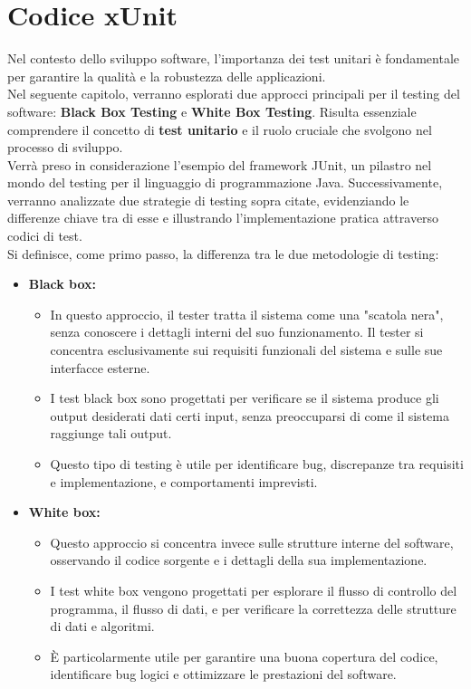 \documentclass{article}
\begin{document}
	\section{Codice xUnit}
	Nel contesto dello sviluppo software, l'importanza dei test unitari è fondamentale per garantire la qualità e la robustezza delle applicazioni.\\
	Nel seguente capitolo, verranno esplorati due approcci principali per il testing del software: \textbf{Black Box Testing} e \textbf{White Box Testing}. 
	Risulta essenziale comprendere il concetto di \textbf{test unitario} e il ruolo cruciale che svolgono nel processo di sviluppo.\\
	Verrà preso in considerazione l'esempio del framework JUnit, un pilastro nel mondo del testing per il linguaggio di programmazione Java. Successivamente, verranno analizzate due strategie di testing sopra citate, evidenziando le differenze chiave tra di esse e illustrando l'implementazione pratica attraverso codici di test.\\
	
	Si definisce, come primo passo, la differenza tra le due metodologie di testing:
	\begin{itemize}
		\item \textbf{Black box:}
		\begin{itemize}
			\item In questo approccio, il tester tratta il sistema come una "scatola nera", senza conoscere i dettagli interni del suo funzionamento. Il tester si concentra esclusivamente sui requisiti funzionali del sistema e sulle sue interfacce esterne.
			\item I test black box sono progettati per verificare se il sistema produce gli output desiderati dati certi input, senza preoccuparsi di come il sistema raggiunge tali output.
			\item Questo tipo di testing è utile per identificare bug, discrepanze tra requisiti e implementazione, e comportamenti imprevisti.
		\end{itemize}
		\item \textbf{White box:}
		\begin{itemize}
			\item Questo approccio si concentra invece sulle strutture interne del software, osservando il codice sorgente e i dettagli della sua implementazione.
			\item I test white box vengono progettati per esplorare il flusso di controllo del programma, il flusso di dati, e per verificare la correttezza delle strutture di dati e algoritmi.
			\item È particolarmente utile per garantire una buona copertura del codice, identificare bug logici e ottimizzare le prestazioni del software.
		\end{itemize}
	\end{itemize}
	\newpage
\end{document}

